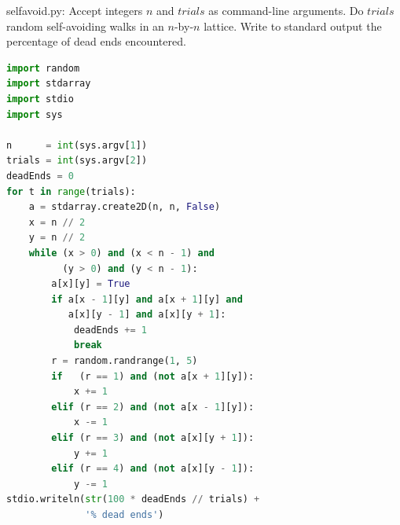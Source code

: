 \documentclass[8pt,a4paper,compress]{beamer}
\begin{document}
\begin{frame}[fragile]
\pause

\begin{framed}
\tiny selfavoid.py: Accept integers $n$ and $trials$ as command-line arguments. Do $trials$ random self-avoiding walks in an $n$-by-$n$ lattice. Write to standard output the percentage of dead ends encountered.
\end{framed}

\begin{minipage}{190pt}
\begin{lstlisting}[language=Python]
import random
import stdarray
import stdio
import sys

n      = int(sys.argv[1])
trials = int(sys.argv[2])
deadEnds = 0
for t in range(trials):
    a = stdarray.create2D(n, n, False)
    x = n // 2
    y = n // 2
    while (x > 0) and (x < n - 1) and 
          (y > 0) and (y < n - 1):
        a[x][y] = True
        if a[x - 1][y] and a[x + 1][y] and 
           a[x][y - 1] and a[x][y + 1]:
            deadEnds += 1
            break
        r = random.randrange(1, 5)
        if   (r == 1) and (not a[x + 1][y]):
            x += 1
        elif (r == 2) and (not a[x - 1][y]):
            x -= 1
        elif (r == 3) and (not a[x][y + 1]):
            y += 1
        elif (r == 4) and (not a[x][y - 1]):
            y -= 1
stdio.writeln(str(100 * deadEnds // trials) + 
              '% dead ends')
\end{lstlisting}
\end{minipage}%
\begin{minipage}{110pt}
\hfill {}

\end{minipage}
\end{frame}
\end{document}
